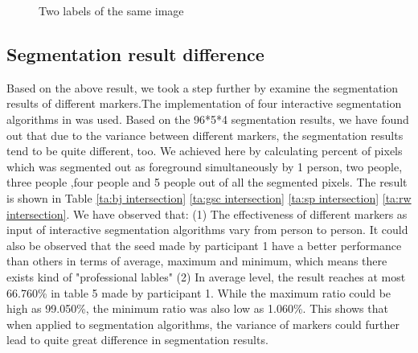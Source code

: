 \documentclass[runningheads,a4paper]{llncs}
\begin{document}
\begin{figure}
\centering

\caption{ Two labels of the same image}
\label{fig}
\end{figure}


\subsection{Segmentation result difference}
Based on the above result, we took a step further by examine the segmentation results of different markers.The implementation of four interactive segmentation algorithms in \citep{gulshan2010geodesic} was used. Based on the 96*5*4 segmentation results, we have found out that due to the variance between different markers, the segmentation results tend to be quite different, too.  We achieved here by calculating percent of pixels which was segmented out as foreground simultaneously by 1 person, two people, three people ,four people and 5 people out of all the segmented pixels. The result is shown in Table \ref{ta:bj intersection} \ref{ta:gsc intersection} \ref{ta:sp intersection} \ref{ta:rw intersection}. We have observed that: (1) The effectiveness of different markers as input of interactive segmentation algorithms vary from person to person.  It could also be observed that the seed made by participant 1 have a better performance than others in terms of average, maximum and minimum, which means there exists kind of "professional lables" \citep{fu2008saliency} (2) In average level, the result reaches at most 66.760\% in table 5 made by participant 1. While the maximum ratio could be high as 99.050\%, the minimum ratio was also low as 1.060\%. This shows that when applied to segmentation algorithms, the variance of markers could further lead to quite great difference in segmentation results.
\end{document}
